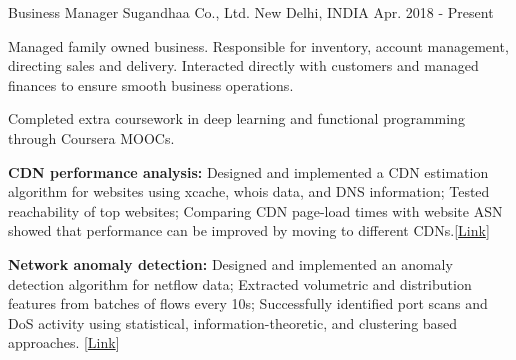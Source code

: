 
\begin{cventries}

  \cventry
    {Business Manager} %
    {Sugandhaa Co., Ltd.} %
    {New Delhi, INDIA} %
    {Apr. 2018 - Present} %
    {
      \begin{cvitems} %
      \item {Managed family owned business. Responsible for inventory, account management, directing sales and delivery. Interacted directly with customers and managed finances to ensure smooth business operations.}
    \item {Completed extra coursework in deep learning and functional programming through Coursera MOOCs.}
    \item {\textbf{CDN performance analysis:} Designed and implemented a CDN estimation algorithm for websites using xcache, whois data, and DNS information; Tested reachability of top websites; Comparing CDN page-load times with website ASN showed that performance can be improved by moving to different CDNs.\hfill [\href{https://github.com/shahifaqeer/cdn-analysis}{Link}]}
    \item {\textbf{Network anomaly detection:} Designed and implemented an anomaly detection algorithm for netflow data; Extracted volumetric and distribution features from batches of flows every 10s; Successfully identified port scans and DoS activity using statistical, information-theoretic, and clustering based approaches. \hfill [\href{https://github.com/shahifaqeer/netflow-anomaly-detector}{Link}]}
      \end{cvitems}
    }


\end{cventries}
